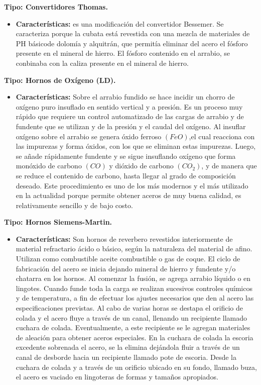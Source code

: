 \documentclass[12pt,a4paper]{article}
\begin{document}
\textbf{Tipo: Convertidores Thomas.}

\begin{itemize}
    \item \textbf{Características:} es una modificación del convertidor Bessemer. Se caracteriza porque la cubata está revestida con una mezcla  de materiales de PH básicode dolomía y alquitrán, que permitía eliminar del acero el fósforo presente en el mineral de hierro. El fósforo contenido en el arrabio, se conbinaba con la caliza presente en el  mineral de hierro.
\end{itemize}

\textbf{Tipo: Hornos de Oxígeno (LD).}

\begin{itemize}
    \item \textbf{Características:} 
    Sobre el arrabio fundido se hace incidir un chorro de oxígeno puro insuflado en sentido vertical y a presión. Es un proceso muy rápido que requiere un control automatizado de las cargas de arrabio y de fundente que se utilizan y de la presión y el caudal del oxígeno. Al insuflar oxígeno sobre el arrabio se genera óxido ferroso $(FeO)$,el cual reacciona con las impurezas y forma óxidos, con los que se eliminan estas impurezas. Luego, se añade rápidamente fundente y se sigue insuflando oxígeno que forma monóxido de carbono $(CO)$ y dióxido de carbono $(CO_2)$, y de manera que se reduce el contenido de carbono, hasta llegar al grado de composición deseado.
    Este procedimiento es uno de los más modernos y el más utilizado en la actualidad porque permite obtener aceros de muy buena calidad, es relativamente sencillo y de bajo costo.
\end{itemize}

\textbf{Tipo: Hornos Siemens-Martin.}

\begin{itemize}
    \item \textbf{Características:} 
    Son hornos de reverbero revestidos interiormente de material refractario ácido o básico, según la naturaleza del material de afino. Utilizan como combustible aceite combustible o gas de coque. El ciclo de fabricación del acero se inicia dejando mineral de hierro y fundente y/o chatarra en los hornos. Al comenzar la fusión, se agrega arrabio líquido o en lingotes. Cuando funde toda la carga se realizan sucesivos controles químicos y de temperatura, a fin de efectuar los ajustes necesarios que den al acero las especificaciones previstas. Al cabo de varias horas se destapa el orificio de colada y el acero fluye a través de un canal, llenando un recipiente llamado cuchara de colada. Eventualmente, a este recipiente se le agregan materiales de aleación para obtener aceros especiales. En la cuchara de colada la escoria excedente sobrenada el acero, se la elimina dejándola fluir a través de un canal de desborde hacia un recipiente llamado pote de escoria. 
    Desde la cuchara de colada y a través de un orificio ubicado en su fondo, llamado buza, el acero es vaciado en lingoteras de formas y tamaños apropiados.
\end{itemize}
\end{document}
